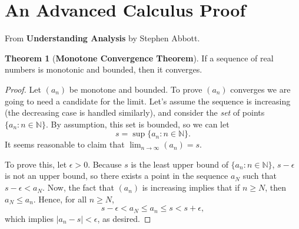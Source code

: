 \documentclass[12pt]{article}
\theoremstyle{definition}
\newtheorem{theorem}{Theorem}[section]
\newcommand{\dlim}{\displaystyle \lim}
\begin{document}
\section{An Advanced Calculus Proof}
From \textbf{Understanding Analysis} by Stephen Abbott.
\begin{theorem}[\textbf{Monotone Convergence Theorem}]
If a sequence of real numbers is monotonic and bounded, then it converges.
\end{theorem}
\begin{proof}
Let $\left( a_{n} \right)$ be monotone and bounded.  To prove $\left( a_{n} \right)$ converges we are going to need a candidate for the limit.  Let's assume the sequence is increasing (the decreasing case is handled similarly), and consider the \textit{set} of points $\{a_{n}:n \in \mathbb{N}\}$.  By assumption, this set is bounded, so we can let
\[
s=\sup \{a_{n}:n \in \mathbb{N} \}.
\]
It seems reasonable to claim that $\dlim_{n \to \infty} \left( a_{n} \right)=s$. 
\\ %
\par
To prove this, let $\epsilon > 0$.  Because $s$ is the least upper bound of $\{a_{n}:n \in \mathbb{N}\}$, $s-\epsilon$ is not an upper bound, so there exists a point in the sequence $a_{N}$ such that $s- \epsilon<a_{N}$.  Now, the fact that $\left( a_{n} \right)$ is increasing implies that if $n \ge N$, then $a_{N} \le a_{n}$.  Hence, for all $n \ge N$,
\[
s- \epsilon<a_{N} \le a_{n} \le s < s+ \epsilon,
\]
which implies $| a_{n}-s | < \epsilon$, as desired.
\end{proof}
\end{document}
